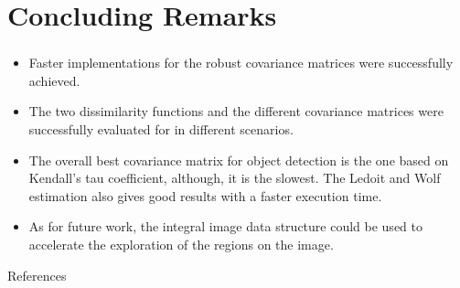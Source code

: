 \documentclass{beamer}
\theoremstyle{definition}
\theoremstyle{remark}
\theoremstyle{example}
\newif\ifinsection
\newif\ifinsubsection
\let\oldsection\section
\renewcommand{\section}{
  \global\insectiontrue
  \global\insubsectionfalse
  \oldsection}
\newcommand {\aframe}[1] {
  \begin{frame}
    \ifinsection\frametitle{\secname}\fi
    \ifinsubsection\framesubtitle{\subsecname}\fi
  #1
  \end{frame}
}
\begin{document}
\section{Concluding Remarks}
\aframe{
  \begin{itemize}
    \item Faster implementations for the robust covariance matrices were
          successfully achieved.\pause
    \item The two dissimilarity functions and the different covariance matrices
          were successfully evaluated for in different scenarios.\pause
    \item The overall best covariance matrix for object detection is the one
          based on Kendall's tau coefficient, although, it is the slowest. The
          Ledoit and Wolf estimation also gives good results with a faster
          execution time.\pause
    \item As for future work, the integral image data
          structure\parencite{porikli2005integral} could be used to accelerate
          the exploration of the regions on the image.
  \end{itemize}
}

\begin{frame}[allowframebreaks]{References}
  \printbibliography
\end{frame}

\begin{frame}
  \begin{minipage}[t][.8\textheight]{\textwidth}
    \vfill
    \begin{center}
      \begin{multicols}{3}
         \\
         \\
        \columnbreak
         \\
         \\
        \columnbreak
         \\
      \end{multicols}
    \end{center}
  \end{minipage}
\end{frame}
\end{document}
